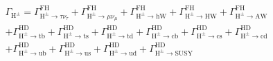 \begin{equation}\label{equ:charged_decay_widths}
\begin{split}
\Gamma_{\text{H}^{\pm}} = \Gamma^{\text{FH}}_{\text{H}^{\pm} \rightarrow\tau\nu_{\tau}} + \Gamma^{\text{FH}}_{\text{H}^{\pm} \rightarrow\mu\nu_{\mu}} + \Gamma^{\text{FH}}_{\text{H}^{\pm} \rightarrow \text{hW}} + \Gamma^{\text{FH}}_{\text{H}^{\pm} \rightarrow \text{HW}} + \Gamma^{\text{FH}}_{\text{H}^{\pm} \rightarrow \text{AW}}\\
+ \Gamma^{\text{HD}}_{\text{H}^{\pm} \rightarrow \text{tb}} + \Gamma^{\text{HD}}_{\text{H}^{\pm} \rightarrow \text{ts}} + \Gamma^{\text{HD}}_{\text{H}^{\pm} \rightarrow \text{td}} +  \Gamma^{\text{HD}}_{\text{H}^{\pm} \rightarrow \text{cb}} + \Gamma^{\text{HD}}_{\text{H}^{\pm} \rightarrow \text{cs}} + \Gamma^{\text{HD}}_{\text{H}^{\pm} \rightarrow \text{cd}}\\
+ \Gamma^{\text{HD}}_{\text{H}^{\pm} \rightarrow \text{ub}} + \Gamma^{\text{HD}}_{\text{H}^{\pm} \rightarrow \text{us}} + \Gamma^{\text{HD}}_{\text{H}^{\pm} \rightarrow \text{ud}} + \Gamma^{\text{HD}}_{\text{H}^{\pm} \rightarrow \text{SUSY}}
\end{split}
\end{equation}
